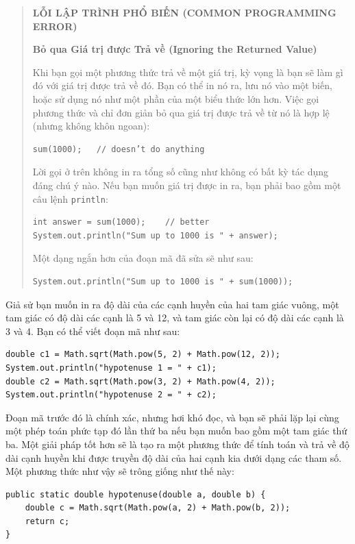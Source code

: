 \begin{quote}
\textbf{LỖI LẬP TRÌNH PHỔ BIẾN (COMMON PROGRAMMING ERROR)}

\textbf{Bỏ qua Giá trị được Trả về (Ignoring the Returned Value)}

Khi bạn gọi một phương thức trả về một giá trị, kỳ vọng là bạn sẽ làm gì
đó với giá trị được trả về đó. Bạn có thể in nó ra, lưu nó vào một biến,
hoặc sử dụng nó như một phần của một biểu thức lớn hơn. Việc gọi phương
thức và chỉ đơn giản bỏ qua giá trị được trả về từ nó là hợp lệ (nhưng
không khôn ngoan):

\begin{verbatim}
sum(1000);   // doesn’t do anything
\end{verbatim}

Lời gọi ở trên không in ra tổng số cũng như không có bất kỳ tác dụng
đáng chú ý nào. Nếu bạn muốn giá trị được in ra, bạn phải bao gồm một
câu lệnh \texttt{println}:

\begin{verbatim}
int answer = sum(1000);    // better
System.out.println("Sum up to 1000 is " + answer);
\end{verbatim}

Một dạng ngắn hơn của đoạn mã đã sửa sẽ như sau:

\begin{verbatim}
System.out.println("Sum up to 1000 is " + sum(1000));
\end{verbatim}
\end{quote}

Giả sử bạn muốn in ra độ dài của các cạnh huyền của hai tam giác vuông,
một tam giác có độ dài các cạnh là 5 và 12, và tam giác còn lại có độ
dài các cạnh là 3 và 4. Bạn có thể viết đoạn mã như sau:

\begin{verbatim}
double c1 = Math.sqrt(Math.pow(5, 2) + Math.pow(12, 2));
System.out.println("hypotenuse 1 = " + c1);
double c2 = Math.sqrt(Math.pow(3, 2) + Math.pow(4, 2));
System.out.println("hypotenuse 2 = " + c2);
\end{verbatim}

Đoạn mã trước đó là chính xác, nhưng hơi khó đọc, và bạn sẽ phải lặp lại
cùng một phép toán phức tạp đó lần thứ ba nếu bạn muốn bao gồm một tam
giác thứ ba. Một giải pháp tốt hơn sẽ là tạo ra một phương thức để tính
toán và trả về độ dài cạnh huyền khi được truyền độ dài của hai cạnh kia
dưới dạng các tham số. Một phương thức như vậy sẽ trông giống như thế
này:

\begin{verbatim}
public static double hypotenuse(double a, double b) { 
    double c = Math.sqrt(Math.pow(a, 2) + Math.pow(b, 2)); 
    return c; 
}
\end{verbatim}

